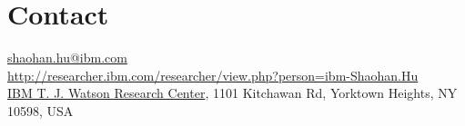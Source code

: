 
\section{\sc Contact}
{\href{mailto:shaohan.hu@ibm.com}{shaohan.hu@ibm.com}}\\
{\url{http://researcher.ibm.com/researcher/view.php?person=ibm-Shaohan.Hu}}\\
{\href{http://www.research.ibm.com/labs/watson/}{IBM T. J. Watson Research Center}}, {1101 Kitchawan Rd, Yorktown Heights, NY 10598, USA}
